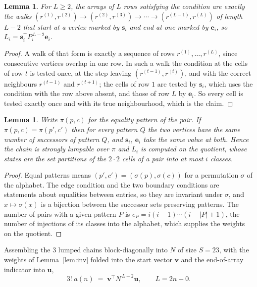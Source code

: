 \documentclass[11pt,a4paper]{article}
\theoremstyle{plain}
\newtheorem{lemma}[theorem]{Lemma}
\theoremstyle{definition}
\begin{document}
\begin{lemma}\label{lem:walk}
For $L\ge2$, the arrays of $L$ rows satisfying the condition are exactly the walks
$(r^{(1)},r^{(2)})\to(r^{(2)},r^{(3)})\to\cdots\to(r^{(L-1)},r^{(L)})$ of length
$L-2$ that start at a vertex marked by $\mathbf{s}_i$ and end at one marked by
$\mathbf{e}_i$, so
$L_i=\mathbf{s}_i^{\!\top}P_i^{\,L-2}\mathbf{e}_i$.
\end{lemma}

\begin{proof}
A walk of that form is exactly a sequence of rows $r^{(1)},\dots,r^{(L)}$, since
consecutive vertices overlap in one row. In such a walk the condition at the cells of
row $t$ is tested once, at the step leaving $(r^{(t-1)},r^{(t)})$, and with the
correct neighbours $r^{(t-1)}$ and $r^{(t+1)}$; the cells of row $1$ are tested by
$\mathbf{s}_i$, which uses the condition with the row above absent, and those of row
$L$ by $\mathbf{e}_i$. So every cell is tested exactly once and with its true
neighbourhood, which is the claim.
\end{proof}

\begin{lemma}\label{lem:lump}
Write $\pi(p,c)$ for the equality pattern of the pair. If $\pi(p,c)=\pi(p',c')$ then for
every pattern $Q$ the two vertices have the same number of successors of pattern $Q$, and
$\mathbf{s}_i$, $\mathbf{e}_i$ take the same value at both. Hence the chain is strongly
lumpable over $\pi$ and $L_i$ is computed on the quotient, whose states are the set
partitions of the $2\cdot2$ cells of a pair into at most $i$ classes.
\end{lemma}

\begin{proof}
Equal patterns means $(p',c')=(\sigma(p),\sigma(c))$ for a permutation $\sigma$ of the
alphabet. The edge condition and the two boundary conditions are statements about equalities
between entries, so they are invariant under $\sigma$, and $x\mapsto\sigma(x)$ is a bijection
between the successor sets preserving patterns. The number of pairs with a given pattern $P$
is $e_P=i(i-1)\cdots(i-|P|+1)$, the number of injections of its classes into the alphabet,
which supplies the weights on the quotient.
\end{proof}

Assembling the $3$ lumped chains block-diagonally into $N$ of size $S=23$, with the
weights of Lemma~\ref{lem:inv} folded into the start vector $\mathbf{v}$ and the
end-of-array indicator into $\mathbf{u}$,
\begin{equation}\label{eq:walk2}
3!\;a(n)\;=\;\mathbf{v}^{\!\top}N^{\,L-2}\mathbf{u},\qquad L=2n+0 .
\end{equation}
\end{document}
